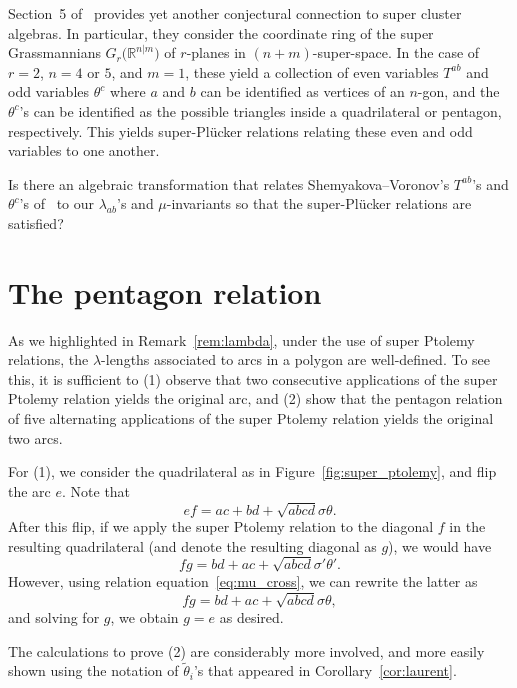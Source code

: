 \documentclass[pdftex]{sigma}
\numberwithin{equation}{section}
\begin{document}
Section~5 of~\cite{sv_19} provides yet another conjectural connection to super cluster algebras. In particular, they consider the coordinate ring of the super Grassmannians $G_{r}\big(\mathbb{R}^{n|m}\big)$ of $r$-planes in $(n+m)$-super-space. In the case of $r=2$, $n=4$ or $5$, and $m=1$, these yield a collection of even variables $T^{ab}$ and odd variables $\theta^c$ where $a$ and $b$ can be identified as vertices of an $n$-gon, and the $\theta^c$'s can be identified as the possible triangles inside a quadrilateral or pentagon, respectively. This yields super-Pl\"ucker relations relating these even and odd variables to one another.

\begin{Question}
Is there an algebraic transformation that relates Shemyakova--Voronov's $T^{ab}$'s and $\theta^c$'s of~{\rm \cite{sv_19}} to our $\lambda_{ab}$'s and $\mu$-invariants so that the super-Pl\"ucker relations are satisfied?
\end{Question}

\appendix
\section{The pentagon relation} \label{appendix}

As we highlighted in Remark~\ref{rem:lambda}, under the use of super Ptolemy relations, the $\lambda$-lengths associated to arcs in a polygon are well-defined. To see this, it is sufficient to (1) observe that two consecutive applications of the super Ptolemy relation yields the original arc, and (2) show that the pentagon relation of five alternating applications of the super Ptolemy relation yields the original two arcs.

For (1), we consider the quadrilateral as in Figure~\ref{fig:super_ptolemy}, and flip the arc $e$.
Note that \[ef = ac + bd + \sqrt{abcd} \sigma \theta.\]
After this flip, if we apply the super Ptolemy relation to the diagonal $f$ in the resulting quadrilateral (and denote the resulting diagonal as $g$), we would have
\[fg = bd + ac + \sqrt{abcd} \sigma' \theta'.\]
However, using relation equation~\eqref{eq:mu_cross}, we can rewrite the latter as
\[fg = bd + ac + \sqrt{abcd} \sigma \theta,\] and solving for $g$, we obtain $g = e$ as desired.

The calculations to prove (2) are considerably more involved, and more easily shown using the notation of $\widetilde{\theta}_i$'s
that appeared in Corollary~\ref{cor:laurent}.
\end{document}
